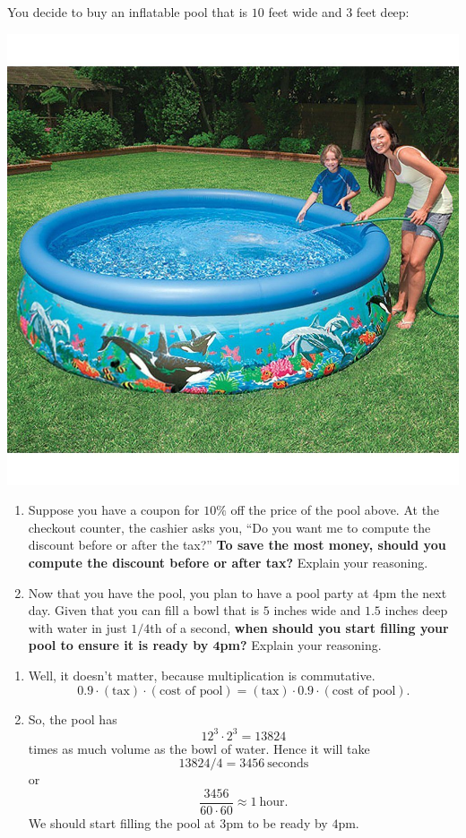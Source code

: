 \documentclass[nooutcomes,noauthor,handout]{ximera}
\begin{document}
\begin{question}
  You decide to buy an inflatable pool that is $10$ feet wide and $3$
  feet deep:
  \begin{center}
    \includegraphics[width=.4\textwidth]{tenFtPool.jpg}
  \end{center}
  \begin{enumerate}
    \item Suppose you have a coupon for $10\%$ off the price of the
      pool above. At the checkout counter, the cashier asks you, ``Do
      you want me to compute the discount before or after the tax?''
      \textbf{To save the most money, should you compute the discount
        before or after tax?} Explain your reasoning.
    \item Now that you have the pool, you plan to have a pool party at
      $4$pm the next day. Given that you can fill a bowl that is $5$
      inches wide and $1.5$ inches deep with water in just $1/4$th of
      a second, \textbf{when should you start filling your pool to
        ensure it is ready by $\boldsymbol 4$pm?}  Explain your
      reasoning.
  \end{enumerate}
  \begin{freeResponse}
    \begin{enumerate}
    \item Well, it doesn't matter, because multiplication is commutative.
      \[
      0.9 \cdot (\text{tax}) \cdot (\text{cost of pool})= (\text{tax})\cdot
      0.9\cdot (\text{cost of pool}).
      \]
    \item So, the pool has
      \[
      12^3 \cdot 2^3 = 13824
      \]
      times as much volume as the bowl of water. Hence it will take
      \[
      13824/4 = 3456 ~\text{seconds}
      \]
      or
      \[
      \frac{3456}{60\cdot 60} \approx 1~\text{hour}.
      \]
      We should start filling the pool at $3$pm to be ready by $4$pm.
    \end{enumerate}
  \end{freeResponse}
\end{question}
\mynewpage
\end{document}
